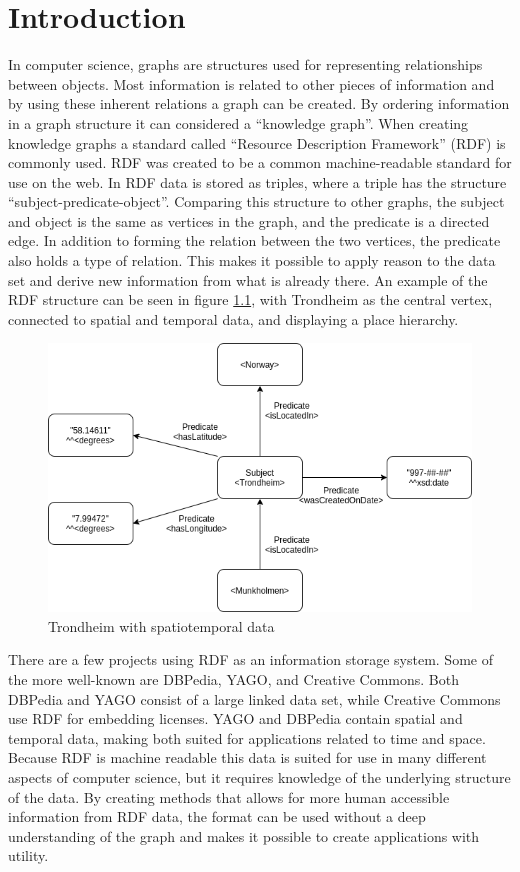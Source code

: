 \chapter{Introduction}
\label{cha:Introduction}
In computer science, graphs are structures used for representing relationships between objects. Most information is related to other pieces of information and by using these inherent relations a graph can be created. By ordering information in a graph structure it can considered a ``knowledge graph''. When creating knowledge graphs a standard called ``Resource Description Framework'' (RDF) is commonly used. RDF was created to be a common machine-readable standard for use on the web. In RDF data is stored as triples, where a triple has the structure ``subject-predicate-object''. Comparing this structure to other graphs, the subject and object is the same as vertices in the graph, and the predicate is a directed edge. In addition to forming the relation between the two vertices, the predicate also holds a type of relation. This makes it possible to apply reason to the data set and derive new information from what is already there. An example of the RDF structure can be seen in figure \ref{fig:spatiotemporalTrondheim}, with Trondheim as the central vertex, connected to spatial and temporal data, and displaying a place hierarchy.

\begin{figure}[h]
  \centering
  \includegraphics[scale=0.5]{figs/rdfSPO.png}
 \caption{Trondheim with spatiotemporal data}
 \label{fig:spatiotemporalTrondheim}
\end{figure}

There are a few projects using RDF as an information storage system. Some of the more well-known are DBPedia\cite{dbpedia}, YAGO\cite{yago}, and Creative Commons. Both DBPedia and YAGO consist of a large linked data set, while Creative Commons use RDF for embedding licenses. YAGO and DBPedia contain spatial and temporal data, making both suited for applications related to time and space. Because RDF is machine readable this data is suited for use in many different aspects of computer science, but it requires knowledge of the underlying structure of the data. By creating methods that allows for more human accessible information from RDF data, the format can be used without a deep understanding of the graph and makes it possible to create applications with utility.

